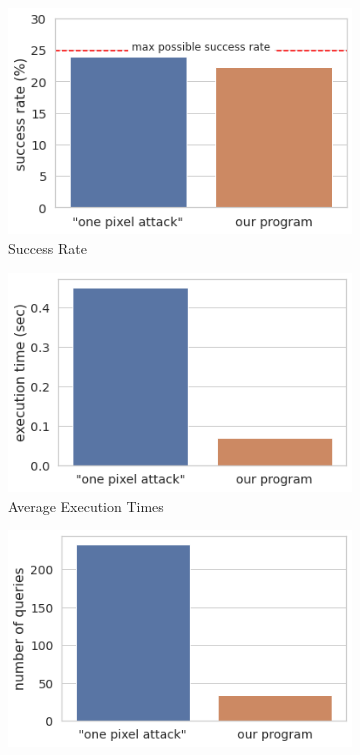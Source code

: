 \documentclass[11pt]{article}
\begin{document}
\begin{figure}
     \centering
     \begin{subfigure}[b]{0.4\textwidth}
         \centering
         \includegraphics[width=\textwidth]{success_rate.png}
         \caption{Success Rate}
         \label{Success Rate}
     \end{subfigure}
     \hfill
     \begin{subfigure}[b]{0.4\textwidth}
         \centering
         \includegraphics[width=\textwidth]{execution_time.png}
         \caption{Average Execution Times}
         \label{execution time}
     \end{subfigure}
     \hfill
     \begin{subfigure}[b]{0.4\textwidth}
         \centering
         \includegraphics[width=\textwidth]{number_queries.png}

\end{subfigure}
\end{figure}
\end{document}
